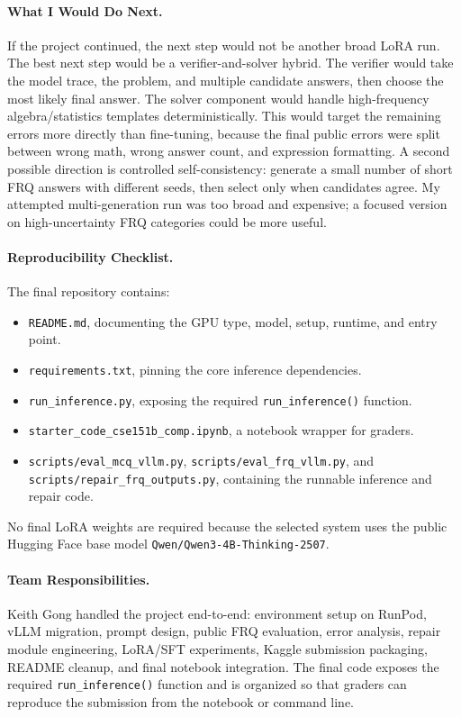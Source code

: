 \documentclass{article}
\begin{document}
\paragraph{What I Would Do Next.}
If the project continued, the next step would not be another broad LoRA run. The best next step would be a verifier-and-solver hybrid. The verifier would take the model trace, the problem, and multiple candidate answers, then choose the most likely final answer. The solver component would handle high-frequency algebra/statistics templates deterministically. This would target the remaining errors more directly than fine-tuning, because the final public errors were split between wrong math, wrong answer count, and expression formatting. A second possible direction is controlled self-consistency: generate a small number of short FRQ answers with different seeds, then select only when candidates agree. My attempted multi-generation run was too broad and expensive; a focused version on high-uncertainty FRQ categories could be more useful.

\paragraph{Reproducibility Checklist.}
The final repository contains:
\begin{itemize}
    \item \texttt{README.md}, documenting the GPU type, model, setup, runtime, and entry point.
    \item \texttt{requirements.txt}, pinning the core inference dependencies.
    \item \texttt{run\_inference.py}, exposing the required \texttt{run\_inference()} function.
    \item \texttt{starter\_code\_cse151b\_comp.ipynb}, a notebook wrapper for graders.
    \item \texttt{scripts/eval\_mcq\_vllm.py}, \texttt{scripts/eval\_frq\_vllm.py}, and \texttt{scripts/repair\_frq\_outputs.py}, containing the runnable inference and repair code.
\end{itemize}
No final LoRA weights are required because the selected system uses the public Hugging Face base model \texttt{Qwen/Qwen3-4B-Thinking-2507}.

\paragraph{Team Responsibilities.}
Keith Gong handled the project end-to-end: environment setup on RunPod, vLLM migration, prompt design, public FRQ evaluation, error analysis, repair module engineering, LoRA/SFT experiments, Kaggle submission packaging, README cleanup, and final notebook integration. The final code exposes the required \texttt{run\_inference()} function and is organized so that graders can reproduce the submission from the notebook or command line.



\end{document}
